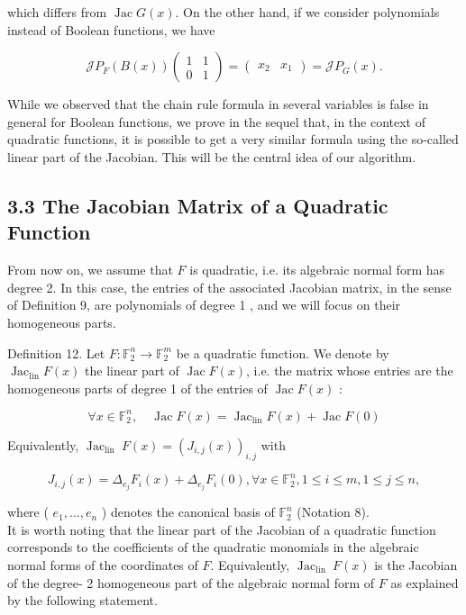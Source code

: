\documentclass[10pt]{article}
\begin{document}
which differs from $\operatorname{Jac} G(x)$. On the other hand, if we consider polynomials instead of Boolean functions, we have

$$
\mathscr{J} P_{F}(B(x))\left(\begin{array}{ll}
1 & 1 \\
0 & 1
\end{array}\right)=\left(\begin{array}{ll}
x_{2} & x_{1}
\end{array}\right)=\mathscr{J} P_{G}(x) .
$$

While we observed that the chain rule formula in several variables is false in general for Boolean functions, we prove in the sequel that, in the context of quadratic functions, it is possible to get a very similar formula using the so-called linear part of the Jacobian. This will be the central idea of our algorithm.

\subsection*{3.3 The Jacobian Matrix of a Quadratic Function}
From now on, we assume that $F$ is quadratic, i.e. its algebraic normal form has degree 2. In this case, the entries of the associated Jacobian matrix, in the sense of Definition 9, are polynomials of degree 1 , and we will focus on their homogeneous parts.

Definition 12. Let $F: \mathbb{F}_{2}^{n} \rightarrow \mathbb{F}_{2}^{m}$ be a quadratic function. We denote by $\operatorname{Jac}_{\operatorname{lin}} F(x)$ the linear part of $\operatorname{Jac} F(x)$, i.e. the matrix whose entries are the homogeneous parts of degree 1 of the entries of $\operatorname{Jac} F(x)$ :

$$
\forall x \in \mathbb{F}_{2}^{n}, \quad \operatorname{Jac} F(x)=\operatorname{Jac}_{\operatorname{lin}} F(x)+\operatorname{Jac} F(0)
$$

Equivalently, $\operatorname{Jac}_{\text {lin }} F(x)=\left(J_{i, j}(x)\right)_{i, j}$ with


\begin{equation*}
J_{i, j}(x)=\Delta_{e_{j}} F_{i}(x)+\Delta_{e_{j}} F_{i}(0), \forall x \in \mathbb{F}_{2}^{n}, 1 \leqslant i \leqslant m, 1 \leqslant j \leqslant n, \tag{3}
\end{equation*}


where ( $e_{1}, \ldots, e_{n}$ ) denotes the canonical basis of $\mathbb{F}_{2}^{n}$ (Notation 8).\\
It is worth noting that the linear part of the Jacobian of a quadratic function corresponds to the coefficients of the quadratic monomials in the algebraic normal forms of the coordinates of $F$. Equivalently, $\operatorname{Jac}_{\text {lin }} F(x)$ is the Jacobian of the degree- 2 homogeneous part of the algebraic normal form of $F$ as explained by the following statement.
\end{document}
